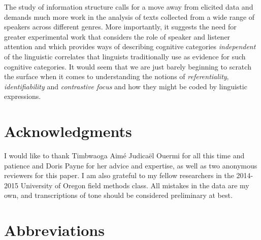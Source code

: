 \documentclass[output=paper]{langsci/langscibook}
\begin{document}
The study of information structure calls for a move away from elicited data and demands much more work in the analysis of texts collected from a wide range of speakers across different genres. More importantly, it suggests the need for greater experimental work that considers the role of speaker and listener attention and which provides ways of describing cognitive categories \textit{independent} of the linguistic correlates that linguists traditionally use as evidence for such cognitive categories. It would seem that we are just barely beginning to scratch the surface when it comes to understanding the notions of \textit{referentiality}, \textit{identifiability} and \textit{contrastive focus} and how they might be coded by linguistic expressions.

\section*{\textbf{Acknowledgments}}

I would like to thank Timbwaoga Aimé Judicaël Ouermi for all this time and patience and Doris Payne for her advice and expertise, as well as two anonymous reviewers for this paper. I am also grateful to my fellow researchers in the 2014-2015 University of Oregon field methods class. All mistakes in the data are my own, and transcriptions of tone should be considered preliminary at best.

\section*{Abbreviations}
\end{document}
